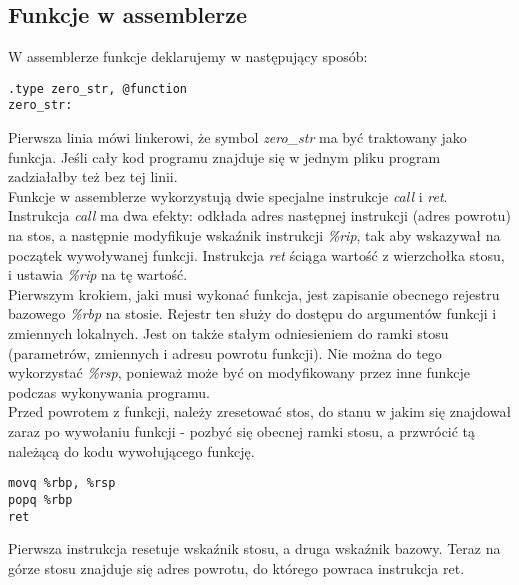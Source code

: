 \documentclass[11pt]{report}
\begin{document}
\subsection{Funkcje w assemblerze}
W assemblerze funkcje deklarujemy w następujący sposób:
\begin{verbatim}
.type zero_str, @function
zero_str:
\end{verbatim}
Pierwsza linia mówi linkerowi, że symbol \textit{zero\_str} ma być traktowany jako funkcja. Jeśli cały kod programu znajduje się w jednym pliku program zadziałałby też bez tej linii.\\
Funkcje w assemblerze wykorzystują dwie specjalne instrukcje \textit{call} i \textit{ret}. Instrukcja \textit{call} ma dwa efekty: odkłada adres następnej instrukcji (adres powrotu) na stos, a następnie modyfikuje wskaźnik instrukcji \textit{\%rip}, tak aby wskazywał na początek wywoływanej funkcji. Instrukcja \textit{ret} ściąga wartość z wierzchołka stosu, i ustawia \textit{\%rip} na tę wartość.
\\Pierwszym krokiem, jaki musi wykonać funkcja, jest zapisanie obecnego rejestru bazowego \textit{\%rbp} na stosie. Rejestr ten służy do dostępu do argumentów funkcji i zmiennych lokalnych. Jest on także stałym odniesieniem do ramki stosu (parametrów, zmiennych i adresu powrotu funkcji). Nie można do tego wykorzystać \textit{\%rsp}, ponieważ może być on modyfikowany przez inne funkcje podczas wykonywania programu.
\\Przed powrotem z funkcji, należy zresetować stos, do stanu w jakim się znajdował zaraz po wywołaniu funkcji - pozbyć się obecnej ramki stosu, a przwrócić tą należącą do kodu wywołującego funkcję. 
\begin{verbatim}
movq %rbp, %rsp
popq %rbp
ret 
\end{verbatim}
Pierwsza instrukcja resetuje wskaźnik stosu, a druga wskaźnik bazowy. Teraz na górze stosu znajduje się adres powrotu, do którego powraca instrukcja ret.
\label{sec:przebieg-cwiczenia}
\end{document}
